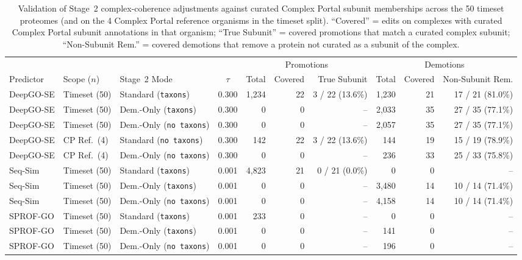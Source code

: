\begin{table}[!h]
\centering
\caption{Validation of Stage~2 complex-coherence adjustments against curated Complex Portal subunit memberships across the 50 timeset proteomes (and on the 4 Complex Portal reference organisms in the timeset split). ``Covered'' = edits on complexes with curated Complex Portal subunit annotations in that organism; ``True Subunit'' = covered promotions that match a curated complex subunit; ``Non-Subunit Rem.'' = covered demotions that remove a protein not curated as a subunit of the complex.}
\label{tab:supp-complex-portal}
\scriptsize
\setlength{\tabcolsep}{2.2pt}
\renewcommand{\arraystretch}{0.95}
\begin{tabular}{lllc rrr rrr}
\toprule
 & & & & \multicolumn{3}{c}{Promotions} & \multicolumn{3}{c}{Demotions} \\
\cmidrule(lr){5-7}\cmidrule(lr){8-10}
Predictor & Scope ($n$) & Stage~2 Mode & $\tau$ & Total & Covered & True Subunit & Total & Covered & Non-Subunit Rem. \\
\midrule
DeepGO-SE & Timeset (50) & Standard (\texttt{taxons})       & 0.300 & 1{,}234 & 22 & 3 / 22 (13.6\%) & 1{,}230 & 21 & 17 / 21 (81.0\%) \\
DeepGO-SE & Timeset (50) & Dem.-Only (\texttt{taxons})      & 0.300 &       0 &  0 & --              & 2{,}033 & 35 & 27 / 35 (77.1\%) \\
DeepGO-SE & Timeset (50) & Dem.-Only (\texttt{no taxons})   & 0.300 &       0 &  0 & --              & 2{,}057 & 35 & 27 / 35 (77.1\%) \\
DeepGO-SE & CP Ref.\ (4) & Standard (\texttt{no taxons})    & 0.300 &   142 & 22 & 3 / 22 (13.6\%) &   144 & 19 & 15 / 19 (78.9\%) \\
DeepGO-SE & CP Ref.\ (4) & Dem.-Only (\texttt{no taxons})   & 0.300 &       0 &  0 & --              &   236 & 33 & 25 / 33 (75.8\%) \\
\midrule
Seq-Sim   & Timeset (50) & Standard (\texttt{taxons})       & 0.001 & 4{,}823 & 21 & 0 / 21 (0.0\%)  &       0 &  0 & -- \\
Seq-Sim   & Timeset (50) & Dem.-Only (\texttt{taxons})      & 0.001 &       0 &  0 & --              & 3{,}480 & 14 & 10 / 14 (71.4\%) \\
Seq-Sim   & Timeset (50) & Dem.-Only (\texttt{no taxons})   & 0.001 &       0 &  0 & --              & 4{,}158 & 14 & 10 / 14 (71.4\%) \\
\midrule
SPROF-GO  & Timeset (50) & Standard (\texttt{taxons})       & 0.001 &   233 &  0 & --              &       0 &  0 & -- \\
SPROF-GO  & Timeset (50) & Dem.-Only (\texttt{taxons})      & 0.001 &       0 &  0 & --              &   141 &  0 & -- \\
SPROF-GO  & Timeset (50) & Dem.-Only (\texttt{no taxons})   & 0.001 &       0 &  0 & --              &   196 &  0 & -- \\
\bottomrule
\end{tabular}
\end{table}
